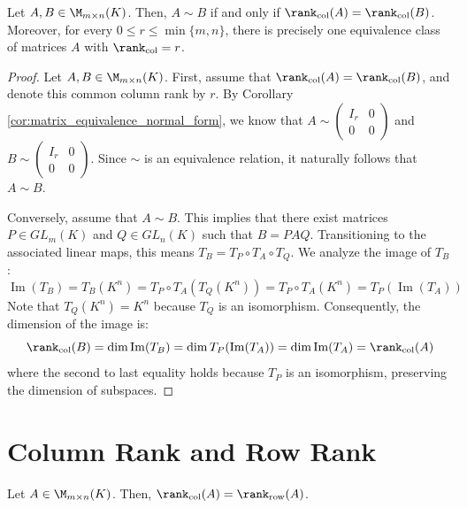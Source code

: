 \begin{corollary}
\label{cor:matrix_rank_equivalence_classification}
Let $A, B \in \M_{m \times n}(K)$. Then, $A \sim B$ if and only if $\rank_{\text{col}}(A) = \rank_{\text{col}}(B)$. Moreover, for every $0 \le r \le \min\{m, n\}$, there is precisely one equivalence class of matrices $A$ with $\rank_{\text{col}} = r$.
\end{corollary}

\begin{proof}
Let $A, B \in \M_{m \times n}(K)$. First, assume that $\rank_{\text{col}}(A) = \rank_{\text{col}}(B)$, and denote this common column rank by $r$. By Corollary \ref{cor:matrix_equivalence_normal_form}, we know that $A \sim \begin{pmatrix} I_r & 0 \\ 0 & 0 \end{pmatrix}$ and $B \sim \begin{pmatrix} I_r & 0 \\ 0 & 0 \end{pmatrix}$. Since $\sim$ is an equivalence relation, it naturally follows that $A \sim B$.

Conversely, assume that $A \sim B$. This implies that there exist matrices $P \in GL_m(K)$ and $Q \in GL_n(K)$ such that $B = PAQ$. Transitioning to the associated linear maps, this means $T_B = T_P \circ T_A \circ T_Q$. We analyze the image of $T_B$:
\begin{equation*}
    \operatorname{Im}(T_B) = T_B(K^n) = T_P \circ T_A(T_Q(K^n)) = T_P \circ T_A(K^n) = T_P(\operatorname{Im}(T_A))
\end{equation*}
Note that $T_Q(K^n) = K^n$ because $T_Q$ is an isomorphism. Consequently, the dimension of the image is:
\begin{equation*}
    \rank_{\text{col}}(B) = \dim \operatorname{Im}(T_B) = \dim T_P(\operatorname{Im}(T_A)) = \dim \operatorname{Im}(T_A) = \rank_{\text{col}}(A)
\end{equation*}
where the second to last equality holds because $T_P$ is an isomorphism, preserving the dimension of subspaces.
\end{proof}

\section{Column Rank and Row Rank}

\begin{theorem}
\label{thm:rank_row_column_equality}
Let $A \in \M_{m \times n}(K)$. Then, $\rank_{\text{col}}(A) = \rank_{\text{row}}(A)$.
\end{theorem}

